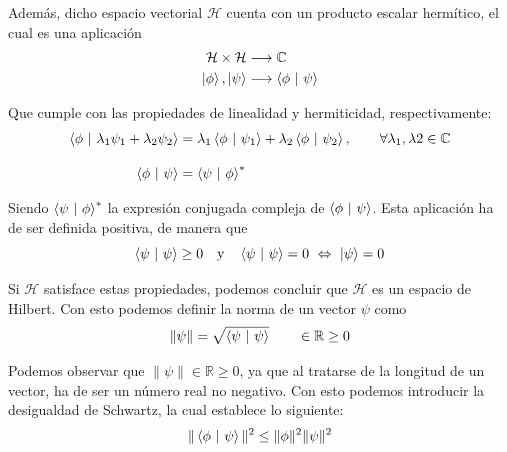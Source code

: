 \documentclass{article}
\numberwithin{equation}{section} %
\begin{document}
    \vspace{1.5mm}

    Además, dicho espacio vectorial \( \mathcal{H} \) cuenta con un producto escalar hermítico, el cual es una aplicación
    \begin{align*}
        \mathcal{H} \times \mathcal{H} &\longrightarrow \mathbb{C} \\
        \ket{\phi}, \ket{\psi} &\longrightarrow \braket{\phi \ | \ \psi}
    \end{align*}

    \vspace{1.5mm}

    Que cumple con las propiedades de linealidad y hermiticidad, respectivamente:
    \begin{align*}
        \braket{\phi \ | \ \lambda_{1}\psi_{1} + \lambda_{2}\psi_{2}} &= \lambda_{1} \braket{\phi \ | \ \psi_{1}} + \lambda_{2} \braket{\phi \ | \ \psi_{2}}, \qquad \forall \lambda_{1}, \lambda{2} \in \mathbb{C} \\[10pt]
        \braket{\phi \ | \ \psi} &= \braket{\psi \ | \ \phi}^{*}
    \end{align*}

    \vspace{1.5mm}

    Siendo \( \braket{\psi \ | \ \phi}^{*} \) la expresión conjugada compleja de \( \braket{\phi \ | \ \psi} \). Esta aplicación ha de ser definida positiva, de manera que
    \begin{equation*}
        \braket{\psi \ | \ \psi} \geq 0 \quad \text{y} \quad \braket{\psi \ | \ \psi} = 0 \ \Leftrightarrow \ \ket{\psi} = 0
    \end{equation*}

    \vspace{1.5mm}

    Si \( \mathcal{H} \) satisface estas propiedades, podemos concluir que \( \mathcal{H} \) es un espacio de Hilbert. Con esto podemos definir la norma de un vector \( \psi \) como
    \begin{equation}
        \| \psi \| = \sqrt{\braket{\psi \ | \ \psi}} \qquad \in \mathbb{R} \geq 0
        \label{eq: norma_producto_escalar}
    \end{equation}

    \vspace{1.5mm}

    Podemos observar que \( \| \psi \| \in \mathbb{R} \geq 0 \), ya que al tratarse de la longitud de un vector, ha de ser un número real no negativo. Con esto podemos introducir la desigualdad de Schwartz, la cual establece lo siguiente:
    \begin{equation}
        \| \braket{\phi \ | \ \psi} \| ^{2} \leq \| \phi \| ^{2} \| \psi \|^{2}
        \label{eq: desigualdad_schwartz}
    \end{equation}
\end{document}
